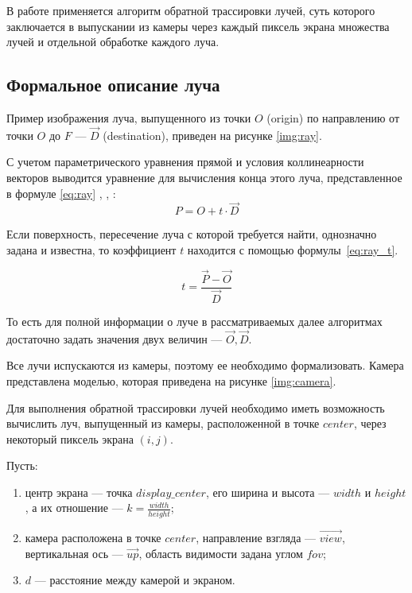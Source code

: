 
В работе применяется алгоритм обратной трассировки лучей, суть которого заключается в выпускании из камеры через каждый пиксель экрана множества лучей и отдельной обработке каждого луча.

\subsection{Формальное описание луча}

Пример изображения луча, выпущенного из точки $O$ (origin) по направлению от точки $O$ до $F$ --- $\overrightarrow{D}$ (destination), приведен на рисунке \ref{img:ray}.

С учетом параметрического уравнения прямой и условия коллинеарности векторов выводится уравнение для вычисления конца этого луча, представленное в формуле \ref{eq:ray} \cite{божко2007компьютерная}, \cite{роджерс}, \cite{боресков}:
\begin{equation}\label{eq:ray}
	P = O + t \cdot \overrightarrow{D}
\end{equation}


Если поверхность, пересечение луча с которой требуется найти, однозначно задана и известна, то коэффициент $t$ находится с помощью формулы~\ref{eq:ray_t}.

\begin{equation}\label{eq:ray_t}
	t = \frac{\overrightarrow{P} - \overrightarrow{O}}{\overrightarrow{D}}
\end{equation}

То есть для полной информации о луче в рассматриваемых далее алгоритмах достаточно задать значения двух величин --- $\overrightarrow{O}, \overrightarrow{D}$.

Все лучи испускаются из камеры, поэтому ее необходимо формализовать.
Камера представлена моделью, которая приведена на рисунке \ref{img:camera}.


Для выполнения обратной трассировки лучей необходимо иметь возможность вычислить луч, выпущенный из камеры, расположенной в точке $center$, через некоторый пиксель экрана $(i, j)$.

Пусть:
\begin{enumerate}
	\item центр экрана --- точка $display\_center$, его ширина и высота --- $width$ и $height$, а их отношение --- $k = \frac{width}{height}$;
	\item камера расположена в точке $center$, направление взгляда --- $\overrightarrow{view}$, вертикальная ось --- $\overrightarrow{up}$, область видимости задана углом $fov$;
	\item $d$ --- расстояние между камерой и экраном.
\end{enumerate}


